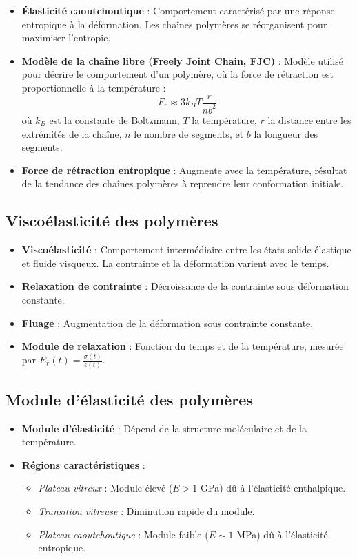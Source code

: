 \documentclass{article}
\begin{document}
    \begin{itemize}
        \item \textbf{Élasticité caoutchoutique} : Comportement caractérisé par une réponse entropique à la déformation. Les chaînes polymères se réorganisent pour maximiser l'entropie.
        \item \textbf{Modèle de la chaîne libre (Freely Joint Chain, FJC)} : Modèle utilisé pour décrire le comportement d'un polymère, où la force de rétraction est proportionnelle à la température :
        \[
        F_r \approx 3k_BT \frac{r}{nb^2}
        \]
        où $k_B$ est la constante de Boltzmann, $T$ la température, $r$ la distance entre les extrémités de la chaîne, $n$ le nombre de segments, et $b$ la longueur des segments.
        \item \textbf{Force de rétraction entropique} : Augmente avec la température, résultat de la tendance des chaînes polymères à reprendre leur conformation initiale.
    \end{itemize}
    
    \subsection{Viscoélasticité des polymères}
    
    \begin{itemize}
        \item \textbf{Viscoélasticité} : Comportement intermédiaire entre les états solide élastique et fluide visqueux. La contrainte et la déformation varient avec le temps.
        \item \textbf{Relaxation de contrainte} : Décroissance de la contrainte sous déformation constante.
        \item \textbf{Fluage} : Augmentation de la déformation sous contrainte constante.
        \item \textbf{Module de relaxation} : Fonction du temps et de la température, mesurée par $E_r(t) = \frac{\sigma(t)}{\epsilon(t)}$.
    \end{itemize}
    
    \subsection{Module d’élasticité des polymères}
    
    \begin{itemize}
        \item \textbf{Module d'élasticité} : Dépend de la structure moléculaire et de la température. 
        \item \textbf{Régions caractéristiques} :
        \begin{itemize}
            \item \textit{Plateau vitreux} : Module élevé ($E > 1$ GPa) dû à l'élasticité enthalpique.
            \item \textit{Transition vitreuse} : Diminution rapide du module.
            \item \textit{Plateau caoutchoutique} : Module faible ($E \sim 1$ MPa) dû à l'élasticité entropique.
        \end{itemize}
    \end{itemize}
    
\end{document}
